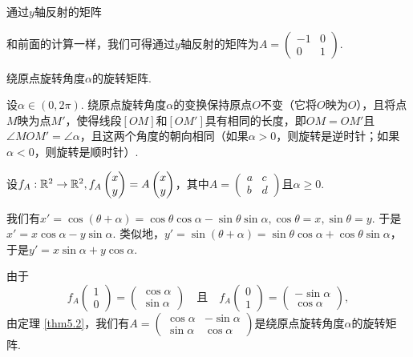 {\noindent \kaishu 通过$y$轴反射的矩阵}

和前面的计算一样，我们可得通过$y$轴反射的矩阵为$A=\begin{pmatrix}
  -1 & 0 \\
  0 & 1
\end{pmatrix}$.

{\kaishu 绕原点旋转角度$\alpha$的旋转矩阵.}

设$\alpha\in(0,2\pi)$. 绕原点旋转角度$\alpha$的变换保持原点$O$不变（它将$O$映为$O$），且将点$M$映为点$M'$，使得线段$[OM]$和$[OM']$具有相同的长度，即$OM=OM'$且$\angle MOM'=\angle\alpha$，且这两个角度的朝向相同（如果$\alpha>0$，则旋转是逆时针；如果$\alpha<0$，则旋转是顺时针）.

设$f_A:\mathbb R^2\to\mathbb R^2,f_A\begin{pmatrix}
  x \\ y
\end{pmatrix}=A\begin{pmatrix}
  x \\ y
\end{pmatrix}$，其中$A=\begin{pmatrix}
  a & c \\
  b & d
\end{pmatrix}$且$\alpha\ge0$.

我们有$x'=\cos(\theta+\alpha)=
\cos\theta\cos\alpha-\sin\theta\sin\alpha,\cos\theta=x,
\sin\theta=y$. 于是$x'=x\cos\alpha-y\sin\alpha$. 类似地，$y'=\sin(\theta+\alpha)=\sin\theta\cos\alpha
+\cos\theta\sin\alpha $，于是$y'=x\sin\alpha+y\cos\alpha$.

由于
\[
  f_A\begin{pmatrix}
    1 \\
    0
  \end{pmatrix} = \begin{pmatrix}
    \cos\alpha \\
    \sin\alpha
  \end{pmatrix} \quad \text{且}\quad
  f_A\begin{pmatrix}
    0 \\
    1
  \end{pmatrix} = \begin{pmatrix}
    -\sin\alpha \\
    \cos\alpha
  \end{pmatrix},
\]
由定理 \ref{thm5.2}，我们有$A=\begin{pmatrix}
  \cos\alpha & -\sin\alpha \\
  \sin\alpha & \cos\alpha
\end{pmatrix}$是{\kaishu 绕原点旋转角度$\alpha$的旋转矩阵.}


